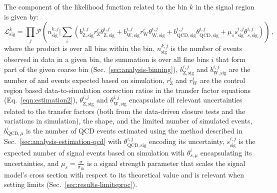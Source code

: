 The component of the likelihood function related to the \njnbht bin $k$ in the 
signal region is given by:
\begin{equation}
\mathcal{L}_\mathrm{sig}^k = \prod_{j} \mathcal{P}\left( n_\mathrm{sig}^{k,j} 
\bigg\rvert \sum_{i} (
b_\mathrm{Z,sig}^{i,j} r_{\mathrm{Z}}^i \theta_\mathrm{Z,sig}^{i,j} + 
b_\mathrm{W,sig}^{i,j} r_{\mathrm{W}}^i \theta_\mathrm{W,sig}^{i,j} + 
b_\mathrm{QCD,sig}^{i,j} \theta_\mathrm{QCD,sig}^{i,j} +
\mu_s s_\mathrm{sig}^{i,j} \theta_{s,\mathrm{sig}}^{i,j}
) \right) \, ,
\end{equation}
where the product is over all \mht bins within the \njnbht bin, 
$n_\mathrm{sig}^{k,j}$ is the number of events observed in data in a given 
\njnbhtmht  
bin, the summation is over all fine \njnbht bins $i$ that form part of the 
given coarse \scalht bin (Sec.~\ref{sec:analysis-binning}), 
$b_\mathrm{Z,sig}^{i,j}$ 
and $b_\mathrm{W,sig}^{i,j}$ are the number of \znnj and \ttw events expected 
based on simulation, $r_{\mathrm{Z}}^i$ and $r_{\mathrm{W}}^i$ are the control 
region based
data-to-simulation correction ratios in the transfer factor equations 
(Eq.~\ref{eqn:estimation2}), $\theta_\mathrm{Z,sig}^{i,j}$ and 
$\theta_\mathrm{W,sig}^{i,j}$ encapsulate all relevant 
uncertainties related to the transfer factors (both from the data-driven 
closure tests and the variations in simulation), the \mht shape, and the 
limited number of 
simulated events, $b_{\mathrm{QCD},\mu}^i$ is the number of QCD events 
estimated using the method described in Sec.~\ref{sec:analysis-estimation-qcd} 
with $\theta_\mathrm{QCD,sig}^{i,j}$ encoding its uncertainty, 
$s_\mathrm{sig}^{i,j}$ is the expected number of signal 
events based on simulation with $\theta_{s,\mu}^i$ encapsulating its 
uncertainties, 
and $\mu_s=\frac{\sigma}{\sigma_{\mathrm{th}}}$ is a signal strength parameter 
that scales the signal model's cross section with respect to its theoretical 
value and is relevant when setting limits (Sec.~\ref{sec:results-limitsproc}).

